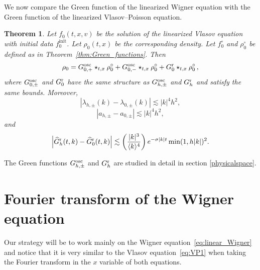 \documentclass[a4paper,12pt]{amsart} %
\theoremstyle{plain}
\newtheorem{thm}{Theorem}[section]
\theoremstyle{definition}
\newcommand		{\lt}			{\left}				%
\newcommand		{\rt}			{\right}			%
\renewcommand	{\(}			{\lt(}
\renewcommand	{\)}			{\rt)}
\newcommand		{\n}[1]			{\lt\lvert{#1}\rt\rvert}	%
\newcommand		{\init}			{\mathrm{init}}
\newcommand	{\h}			{h}
\newcommand		{\Gr}			{G^{\textnormal{r}}}
\newcommand		{\Gosc}			{G^{\textnormal{osc}}}
\newcommand		{\hatG}			{\widehat{G}}
\newcommand		{\hatGr}		{\hatG^{\textnormal{r}}}
\begin{document}
	We now compare the Green function of the linearized Wigner equation with the Green function of the linearized Vlasov--Poisson equation.

	\begin{thm}\label{thm:Green_functions_limit}
		Let $f_0(t,x,v)$ be the solution of the linearized Vlasov equation with initial data $f_0^{\init}$. Let $\rho_0(t,x)$ be the corresponding density. Let $f_0^\circ$ and $\rho_0^\circ$ be defined as in Theorem~\ref{thm:Green_functions}. Then 
		\begin{equation*} %
			\rho_0 = \Gosc_{0,+} \star_{t,x} \rho_0^\circ + \Gosc_{0,-} \star_{t,x} \rho_0^\circ + \Gr_0 \star_{t,x} \rho_0^\circ\, ,
		\end{equation*}
		where $\Gosc_{0,\pm}$ and $\Gr_0$ have the same structure as $\Gosc_{\h,\pm}$ and $\Gr_\h$ and satisfy the same bounds.
		Moreover,
		\begin{equation*}
			\n{\lambda_{\h,\pm}(k) - \lambda_{0,\pm}(k)} \lesssim \n{k}^4 h^2,
		\end{equation*}
		\begin{equation*}
			\n{a_{\h,\pm} - a_{0,\pm}} \lesssim \n{k}^4 h^2,
		\end{equation*}
		and 
		\begin{equation*}
			\n{\hatGr_\h(t,k) - \hatGr_0(t,k)} \lesssim \lt( {|k|^3 \over \langle k \rangle^4} \rt) e^{- \sigma \n{k} t} \min(1,h|k|)^2 .
		\end{equation*}
	\end{thm}

	The Green functions $\Gosc_{h,\pm}$ and $\Gr_h$ are studied in detail in section \ref{physicalspace}.

\medskip


\section{Fourier transform of the Wigner equation}



	Our strategy will be to work mainly on the Wigner equation~\eqref{eq:linear_Wigner} and notice that it is very similar to the Vlasov equation~\eqref{eq:VP1} when taking the Fourier transform in the $x$ variable of both equations.
\end{document}
